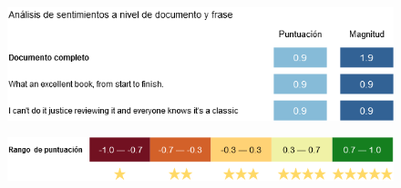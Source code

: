 \documentclass[10pt]{beamer}
\begin{document}
\begin{frame}
\vspace{1.5cm}
\begin{figure}[htbp]
	\begin{center}
		\includegraphics[width = .95\textwidth]{Figuras/puntuacion.png}
	\end{center}
\end{figure}
\pause
\vspace{0.5cm}
\begin{figure}[htbp]
	\begin{center}
		\includegraphics[width = .95\textwidth]{Figuras/estrellas.png}
	\end{center}
\end{figure}
\end{frame}
\end{document}
